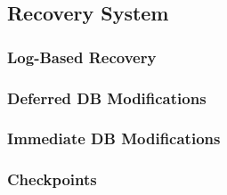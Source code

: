 \subsection{Recovery System}
\subsubsection{Log-Based Recovery}
\subsubsection{Deferred DB Modifications}
\subsubsection{Immediate DB Modifications}
\subsubsection{Checkpoints}